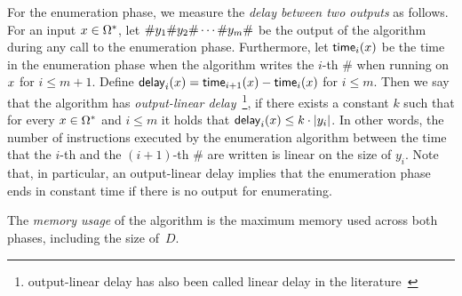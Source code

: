 For the enumeration phase, we measure the \emph{delay between two outputs} as follows. For an input $x\in\Omega^*$, let $\# y_1 \# y_2\#\cdots\#y_m\#$ be the output of the algorithm during any call to the enumeration phase. Furthermore, let $\mathsf{time}_i(x)$ be the time in the enumeration phase when the algorithm writes the $i$-th $\#$ when running on $x$ for $i \leq m+1$. 
Define $\mathsf{delay}_i(x) = \mathsf{time}_{i+1}(x) - \mathsf{time}_{i}(x)$ for $i \leq m$. 
Then we say that the algorithm has {\em output-linear delay}~\cite{FlorenzanoRUVV20}\footnote{output-linear delay has also been called linear delay in the literature~\cite{Courcelle09}}, if there exists a constant $k$ such that for every $x\in\Omega^*$ and $i \leq m$ it holds that $\mathsf{delay}_i(x) \leq k \cdot |y_i|$. In other words, the number of instructions executed by the enumeration algorithm between the time that the $i$-th and the $(i+1)$-th \# are written is linear on the size of $y_i$.
Note that, in particular, an output-linear delay implies that the enumeration phase ends in constant time if there is no output for enumerating. 

The \emph{memory usage} of the algorithm is the maximum memory
used across both phases, including the size of~$D$.







